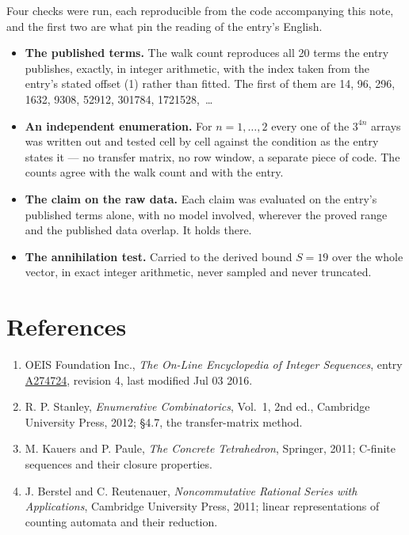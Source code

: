 \documentclass[11pt]{article}
\theoremstyle{definition}
\begin{document}
Four checks were run, each reproducible from the code accompanying this note, and the first two are what pin the reading of the entry's English.

\begin{itemize}

\item {\bfseries The published terms.} The walk count reproduces all 20 terms the entry publishes, exactly, in integer arithmetic, with the index taken from the entry's stated offset (1) rather than fitted. The first of them are 14, 96, 296, 1632, 9308, 52912, 301784, 1721528,~\dots

\item {\bfseries An independent enumeration.} For $n = 1,\dots,2$ every one of the $3^{4n}$ arrays was written out and tested cell by cell against the condition as the entry states it --- no transfer matrix, no row window, a separate piece of code. The counts agree with the walk count and with the entry.

\item {\bfseries The claim on the raw data.} Each claim was evaluated on the entry's published terms alone, with no model involved, wherever the proved range and the published data overlap. It holds there.

\item {\bfseries The annihilation test.} Carried to the derived bound $S = 19$ over the whole vector, in exact integer arithmetic, never sampled and never truncated.

\end{itemize}

\section{References}

\begin{enumerate}

\item OEIS Foundation Inc., \emph{The On-Line Encyclopedia of Integer Sequences}, entry \href{https://oeis.org/A274724}{A274724}, revision 4, last modified Jul 03 2016.

\item R. P. Stanley, \emph{Enumerative Combinatorics}, Vol.~1, 2nd ed., Cambridge University Press, 2012; \S4.7, the transfer-matrix method.

\item M. Kauers and P. Paule, \emph{The Concrete Tetrahedron}, Springer, 2011; C-finite sequences and their closure properties.

\item J. Berstel and C. Reutenauer, \emph{Noncommutative Rational Series with Applications}, Cambridge University Press, 2011; linear representations of counting automata and their reduction.

\end{enumerate}
\end{document}
